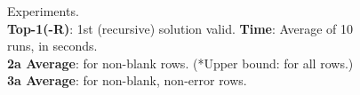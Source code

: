 \begin{figure}
\vsepBeforeCaption
  \captionsetup{justification=centering}
  \caption{
    Experiments.
    \\
      \textbf{Top-1(-R)}:
      1st (recursive) solution valid.
    \textbf{Time}:
       Average of 10 runs, in seconds.
    \\
    \textbf{2a Average}:
      \pctFewerExamplesTopOne{} for \numBenchmarks{} non-blank rows.
      (*Upper bound: \pctFewerExamplesTopOneUpperBound{} for all
     \numBenchmarksAll{} rows.)
    \\
    \textbf{3a Average}:
      \pctFewerExamplesBaseCaseStrategy{} for
      \numBenchmarksBase{} non-blank, non-error rows.
  }
\label{fig:experiments}
\end{figure}
